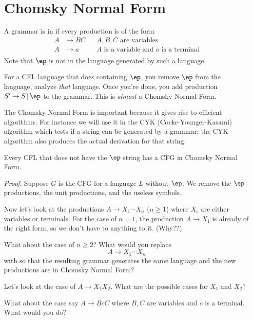 \section{Chomsky Normal Form}

A grammar is in  if every production
is of the form
\begin{align*}
 A &\rightarrow BC &\,\,\,\,\,\text{$A,B,C$ are variables} \\
 A &\rightarrow a  &\,\,\,\,\,\text{$A$ is a variable and $a$ is a
 terminal} \\
\end{align*}
Note that $\ep$ is not in the language generated by such a
language.

For a CFL language that does containing $\ep$, you remove $\ep$ from the
language, analyze \textit{ that} language. Once you're done, you add
production $S' \rightarrow S\,|\, \ep$ to the grammar. This is
\textit{ almost} a Chomsky Normal Form.


The Chomsky Normal Form is important because it gives rise to
efficient algorithms. For instance we will use it in the CYK
(Cocke-Younger-Kasami) algorithm which tests if a string can be
generated by a grammar; the CYK algorithm also produces the actual
derivation for that string.

\begin{thm} Every CFL that does not have the $\ep$ string has a
CFG in Chomsky Normal Form.
\end{thm}

\textit{ Proof.}
Suppose $G$ is the CFG for a language $L$ without $\ep$. We remove
the $\ep$-productions, the unit productions, and the useless
symbols.

Now let's look at the productions $A \rightarrow X_1 \cdots X_n$
($n\geq 1$) where $X_i$ are either variables or terminals. 
For the case of $n=1$, the production $A \rightarrow
X_1$ is already of the right form, so we don't have to anything to
it. (Why??)

What about the case of $n \geq 2$? What would you replace
\[
 A \rightarrow X_1 \cdots X_n
\]
with so that the resulting grammar generates the same language and
the new productions are in Chomsky Normal Form?

Let's look at the case of $A \rightarrow X_1 X_2$. What are the
possible cases for $X_1$ and $X_2$?

What about the case say $A \rightarrow BcC$ where $B,C$ are
variables and $c$ is a terminal. What would you do?

